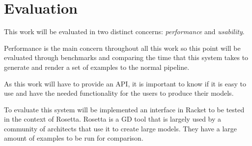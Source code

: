 
% 
% 

\section{Evaluation}
\label{sec:evaluation}

This work will be evaluated in two distinct concerns: \emph{performance} and \emph{usability}.

Performance is the main concern throughout all this work so this point will be evaluated through benchmarks and comparing the time that this system takes to generate and render a set of examples to the normal pipeline.

As this work will have to provide an API, it is important to know if it is easy to use and have the needed functionality for the users to produce their models.

To evaluate this system will be implemented an interface in Racket to be tested in the context of Rosetta. Rosetta is a GD tool that is largely used by a community of architects that use it to create large models. They have a large amount of examples to be run for comparison. 



